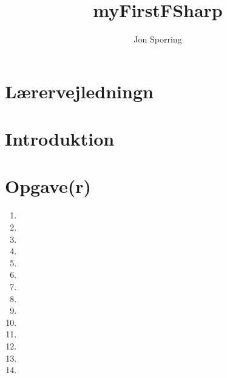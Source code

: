 \documentclass[a4paper,12pt]{article}
\title{myFirstFSharp}
\author{Jon Sporring}
\begin{document}
\maketitle

\section{Lærervejledningn}

\section{Introduktion}

\section{Opgave(r)}
\begin{enumerate}
\item 
\item 
\item 
\item 
\item 
\item 
\item 
\item 
\item 
\item 
\item 
\item 
\item 
\item 
\end{enumerate}
\end{document}
